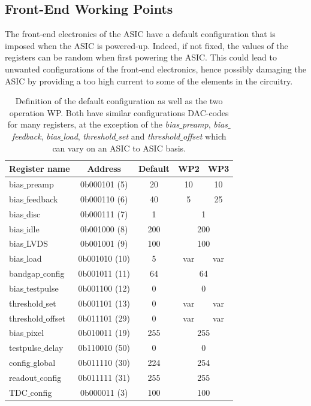 		\subsection{Front-End Working Points}
		The front-end electronics of the ASIC have a default configuration that is imposed when the ASIC is powered-up. Indeed, if not fixed, the values of the registers can be random when first powering the ASIC. This could lead to unwanted configurations of the front-end electronics, hence possibly damaging the ASIC by providing a too high current to some of the elements in the circuitry.
		
		\begin{table}[h]
			\centering
			\renewcommand{\arraystretch}{1.2}
			\begin{tabular}{|l|c|c|c|c|}
			\hline
			\textbf{Register name} & \textbf{Address} & \textbf{Default} & \textbf{WP2} & \textbf{WP3} \\
			\hline
			bias$\_$preamp        & 0b000101 (5)   & 20  & 10  & 10 					\\ \hline
			bias$\_$feedback      & 0b000110 (6)   & 40  & 5   & 25 					\\ \hline
			bias$\_$disc          & 0b000111 (7)   & 1   & \multicolumn{2}{c|}{1} 	\\ \hline
			bias$\_$idle          & 0b001000 (8)   & 200 & \multicolumn{2}{c|}{200} \\ \hline
			bias$\_$LVDS          & 0b001001 (9)   & 100 & \multicolumn{2}{c|}{100} \\ \hline
			bias$\_$load          & 0b001010 (10)  & 5   & var & var 				\\ \hline
			bandgap$\_$config     & 0b001011 (11)  & 64  & \multicolumn{2}{c|}{64} 	\\ \hline
			bias$\_$testpulse     & 0b001100 (12)  & 0   & \multicolumn{2}{c|}{0} 	\\ \hline
			threshold$\_$set      & 0b001101 (13)  & 0   & var & var 				\\ \hline
			threshold$\_$offset   & 0b011101 (29)  & 0   & var & var 				\\ \hline
			bias$\_$pixel         & 0b010011 (19)  & 255 & \multicolumn{2}{c|}{255} \\ \hline
			testpulse$\_$delay    & 0b110010 (50)  & 0   & \multicolumn{2}{c|}{0} 	\\ \hline
			config$\_$global      & 0b011110 (30)  & 224 & \multicolumn{2}{c|}{254} \\ \hline
			readout$\_$config     & 0b011111 (31)  & 255 & \multicolumn{2}{c|}{255} \\ \hline
			TDC$\_$config         & 0b000011 (3)   & 100 & \multicolumn{2}{c|}{100} \\ \hline
			\end{tabular}
			\caption{Definition of the default configuration as well as the two operation WP. Both have similar configurations DAC-codes for many registers, at the exception of the \textit{bias$\_$preamp}, \textit{bias$\_$feedback}, \textit{bias$\_$load}, \textit{threshold$\_$set} and \textit{threshold$\_$offset} which can vary on an ASIC to ASIC basis.}
			\label{tab:frontend_wp}
		\end{table}
		
